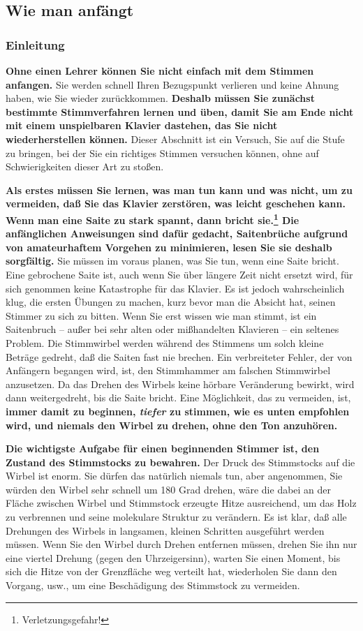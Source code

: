 
\subsection{Wie man anfängt}
\label{c2_5}

\subsubsection{Einleitung}
\label{c2_5a}

\textbf{Ohne einen Lehrer können Sie nicht einfach mit dem Stimmen anfangen.}
Sie werden schnell Ihren Bezugspunkt verlieren und keine Ahnung haben, wie Sie wieder zurückkommen.
\textbf{Deshalb müssen Sie zunächst bestimmte Stimmverfahren lernen und üben, damit Sie am Ende nicht mit einem unspielbaren Klavier dastehen, das Sie nicht wiederherstellen können.}
Dieser Abschnitt ist ein Versuch, Sie auf die Stufe zu bringen, bei der Sie ein richtiges Stimmen versuchen können, ohne auf Schwierigkeiten dieser Art zu stoßen.

\textbf{Als erstes müssen Sie lernen, was man tun kann und was nicht, um zu vermeiden, daß Sie das Klavier zerstören, was leicht geschehen kann.
Wenn man eine Saite zu stark spannt, dann bricht sie.\footnote{Verletzungsgefahr!}
Die anfänglichen Anweisungen sind dafür gedacht, Saitenbrüche aufgrund von amateurhaftem Vorgehen zu minimieren, lesen Sie sie deshalb sorgfältig.}
Sie müssen im voraus planen, was Sie tun, wenn eine Saite bricht.
Eine gebrochene Saite ist, auch wenn Sie über längere Zeit nicht ersetzt wird, für sich genommen keine Katastrophe für das Klavier.
Es ist jedoch wahrscheinlich klug, die ersten Übungen zu machen, kurz bevor man die Absicht hat, seinen Stimmer zu sich zu bitten.
Wenn Sie erst wissen wie man stimmt, ist ein Saitenbruch -- außer bei sehr alten oder mißhandelten Klavieren --  ein seltenes Problem.
Die Stimmwirbel werden während des Stimmens um solch kleine Beträge gedreht, daß die Saiten fast nie brechen.
Ein verbreiteter Fehler, der von Anfängern begangen wird, ist, den Stimmhammer am falschen Stimmwirbel anzusetzen.
Da das Drehen des Wirbels keine hörbare Veränderung bewirkt, wird dann weitergedreht, bis die Saite bricht.
Eine Möglichkeit, das zu vermeiden, ist, \textbf{immer damit zu beginnen, \textit{tiefer} zu stimmen, wie es unten empfohlen wird, und niemals den Wirbel zu drehen, ohne den Ton anzuhören.}

\textbf{Die wichtigste Aufgabe für einen beginnenden Stimmer ist, den Zustand des Stimmstocks zu bewahren.}
Der Druck des Stimmstocks auf die Wirbel ist enorm.
Sie dürfen das natürlich niemals tun, aber angenommen, Sie würden den Wirbel sehr schnell um 180 Grad drehen, wäre die dabei an der Fläche zwischen Wirbel und Stimmstock erzeugte Hitze ausreichend, um das Holz zu verbrennen und seine molekulare Struktur zu verändern.
Es ist klar, daß alle Drehungen des Wirbels in langsamen, kleinen Schritten ausgeführt werden müssen.
Wenn Sie den Wirbel durch Drehen entfernen müssen, drehen Sie ihn nur eine viertel Drehung (gegen den Uhrzeigersinn), warten Sie einen Moment, bis sich die Hitze von der Grenzfläche weg verteilt hat, wiederholen Sie dann den Vorgang, usw., um eine Beschädigung des Stimmstock zu vermeiden.

